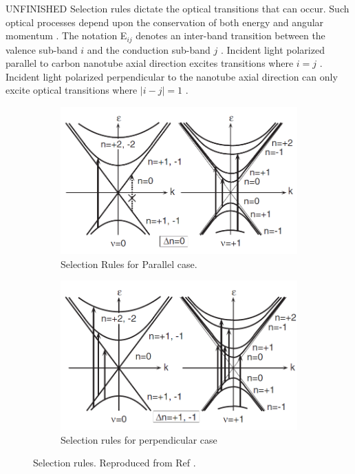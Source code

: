 {\color{red}UNFINISHED} Selection rules dictate the optical transitions that can occur. Such optical processes depend upon the conservation of both energy and angular momentum \cite{weismanKonoBook}. The notation E$_{ij}$ denotes an inter-band transition between the valence sub-band $i$ and the conduction sub-band $j$ \cite{weismanKonoBook}. Incident light polarized parallel to carbon nanotube axial direction excites transitions where $i=j$ \cite{weismanKonoBook}. Incident light polarized perpendicular to the nanotube axial direction can only excite optical transitions where $|i-j|=1$ \cite{weismanKonoBook}. 

\begin{figure}[h]
	\centering
	\begin{subfigure}{\textwidth}
		\centering
		\includegraphics[scale=0.57]{images/chapter_optical_props/selection_rules_1.png}
		\caption{Selection Rules for Parallel case.}
	\end{subfigure}
	\begin{subfigure}{\textwidth}
		\centering
		\includegraphics[scale=0.57]{images/chapter_optical_props/selection_rules_2.png}
		\caption{Selection rules for perpendicular case}
	\end{subfigure}
	\caption{Selection rules. Reproduced from Ref \cite{ando2005theory}.}
	\label{fig:selection_rules}
\end{figure}
